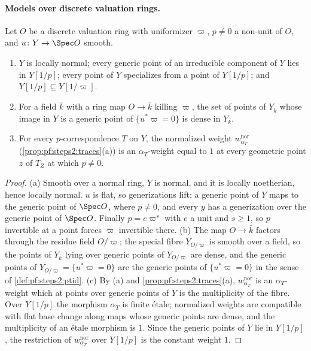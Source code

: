 \paragraph{Models over discrete valuation rings.}

\begin{lemma}\label{lem:pf:steps2:basefacts}
Let $O$ be a discrete valuation ring with uniformizer $\varpi$, $p\ne0$ a non-unit of $O$, and
$u\colon Y\to\Spec O$ smooth.
\begin{enumerate}[label=\textup{(\alph*)},nosep]
\item $Y$ is locally normal; every generic point of an irreducible component of $Y$ lies in
  $Y[1/p]$; every point of $Y$ specializes from a point of $Y[1/p]$; and $Y[1/p]\subseteq
  Y[1/\varpi]$.
\item For a field $\bar k$ with a ring map $O\to\bar k$ killing $\varpi$, the set of points of
  $Y_{\bar k}$ whose image in $Y$ is a generic point of $\{u^\ast\varpi=0\}$ is dense in $Y_{\bar k}$.
\item For every $p$-correspondence $T$ on $Y$, the normalized weight $w^{\mathrm{nor}}_{\alpha_T}$
  (\cref{prop:pf:steps2:traces}(a)) is an $\alpha_T$-weight equal to $1$ at every geometric point $z$
  of $T_Z$ at which $p\ne0$.
\end{enumerate}
\end{lemma}

\begin{proof}
(a) Smooth over a normal ring, $Y$ is normal, and it is locally noetherian, hence locally normal.
$u$ is flat, so generizations lift: a generic point of $Y$ maps to the generic point of $\Spec O$,
where $p\ne0$, and every $y$ has a generization over the generic point of $\Spec O$. Finally
$p=e\varpi^s$ with $e$ a unit and $s\ge1$, so $p$ invertible at a point forces $\varpi$ invertible
there.
(b) The map $O\to\bar k$ factors through the residue field $O/\varpi$; the special fibre $Y_{O/\varpi}$
is smooth over a field, so the points of $Y_{\bar k}$ lying over generic points of $Y_{O/\varpi}$ are
dense, and the generic points of $Y_{O/\varpi}=\{u^\ast\varpi=0\}$ are the generic points of
$\{u^\ast\varpi=0\}$ in the sense of \cref{def:pf:steps2:ptid}.
(c) By (a) and \cref{prop:pf:steps2:traces}(a), $w^{\mathrm{nor}}_{\alpha_T}$ is an $\alpha_T$-weight which
at points over generic points of $Y$ is the multiplicity of the fibre. Over $Y[1/p]$ the morphism
$\alpha_T$ is finite \'etale; normalized weights are compatible with flat base change along maps
whose generic points are dense, and the multiplicity of an \'etale morphism is $1$. Since the generic
points of $Y$ lie in $Y[1/p]$, the restriction of $w^{\mathrm{nor}}_{\alpha_T}$ over $Y[1/p]$ is the
constant weight $1$.
\end{proof}

